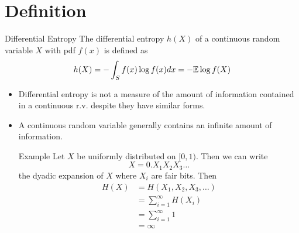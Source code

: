 \documentclass[../main.tex]{subfiles}
\begin{document}
\section{Definition}
\begin{gbox}{Differential Entropy}
    The differential entropy $h(X)$ of a continuous random variable $X$ with pdf $f(x)$ is defined as \[
    h(X) = -\int_{S} f(x) \log f(x) dx = -\mathbb{E} \log f(X)
    \]
\end{gbox}
\begin{remark}
    \begin{itemize}
        \item Differential entropy is not a measure of the amount of information contained in a continuous r.v. despite they have similar forms. 
        \item A continuous random variable generally contains an infinite amount of information.
        \begin{pbox}{Example}
    Let $X$ be uniformly distributed on $[0,1)$. Then we can write \[
    X = 0.X_1 X_2 X_3\dots
    \]
    the dyadic expansion of $X$ where $X_i$ are fair bits.
    \newline
    Then \begin{align*}
        H(X)&=H(X_1,X_2,X_3,\dots)\\
        &= \sum_{i=1}^\infty H(X_i) \\
        &= \sum_{i=1}^\infty 1\\
        &= \infty
    \end{align*}
\end{pbox}
    \end{itemize}
\end{remark}
\newpage
\end{document}
